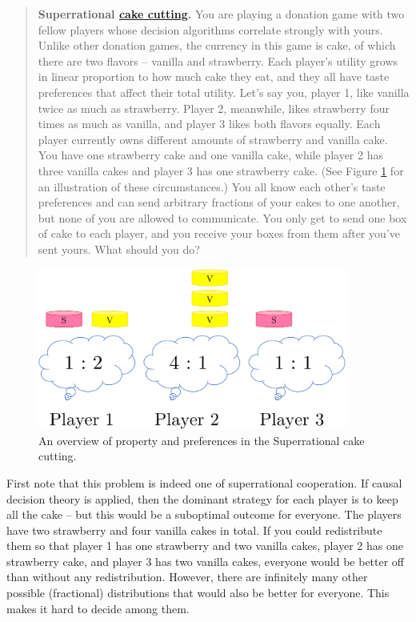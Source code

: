 \begin{quote}
\textbf{Superrational
\href{https://en.wikipedia.org/wiki/Fair_cake-cutting}{cake
cutting}.} You are playing a donation game with two fellow players
whose decision algorithms correlate strongly with yours. Unlike other
donation games, the currency in this game is cake, of which there are
two flavors -- vanilla and strawberry. Each player's utility grows in
linear proportion to how much cake they eat, and they all have taste
preferences that affect their total utility. Let's say you, player 1,
like vanilla twice as much as strawberry. Player 2, meanwhile, likes
strawberry four times as much as vanilla, and player 3 likes both
flavors equally. Each player currently owns different amounts of
strawberry and vanilla cake. You have one strawberry cake and one
vanilla cake, while player 2 has three vanilla cakes and player 3 has
one strawberry cake. (See Figure
\ref{Superrational-cake-cutting} for an illustration of
these circumstances.) You all know each other's taste preferences and
can send arbitrary fractions of your cakes to one another, but none of
you are allowed to communicate. You only get to send one box of cake to
each player, and you receive your boxes from them after you've sent
yours. What should you do?
\end{quote}

\begin{figure}[h!]
    \centering
    \includegraphics[width=4in]{figs/Superrational-cake-cutting}
    \caption{An overview of property and preferences in the Superrational cake cutting.}
    \label{Superrational-cake-cutting}
\end{figure}

First note that this problem is indeed one of superrational cooperation.
If causal decision theory is applied, then the dominant strategy for
each player is to keep all the cake -- but this would be a suboptimal
outcome for everyone. The players have two strawberry and four vanilla
cakes in total. If you could redistribute them so that player 1 has one
strawberry and two vanilla cakes, player 2 has one strawberry cake, and
player 3 has two vanilla cakes, everyone would be better off than
without any redistribution. However, there are infinitely many
other possible (fractional) distributions that would also be better for
everyone. This makes it hard to decide among them.

